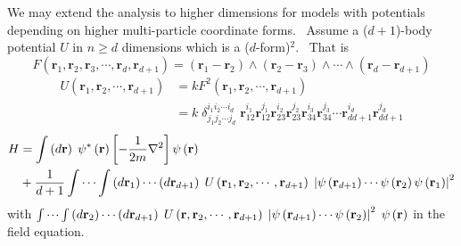 \documentclass[a4paper,12pt]{article}%
\begin{document}
We may extend the analysis to higher dimensions for models with potentials
depending on higher multi-particle coordinate forms. \ Assume a ($d+1$)-body
potential $U$ in $n\geq d$ dimensions which is a ($d$-form)$^{2}$. \ That is
\[
F\left(  \mathbf{r}_{1},\mathbf{r}_{2},\mathbf{r}_{3},\cdots,\mathbf{r}%
_{d},\mathbf{r}_{d+1}\right)  =(\mathbf{r}_{1}-\mathbf{r}_{2})\wedge
(\mathbf{r}_{2}-\mathbf{r}_{3})\wedge\cdots\wedge(\mathbf{r}_{d}%
-\mathbf{r}_{d+1})
\]%
\begin{align*}
U\left(  \mathbf{r}_{1},\mathbf{r}_{2},\cdots,\mathbf{r}_{d+1}\right)   &
=kF^{2}\left(  \mathbf{r}_{1},\mathbf{r}_{2},\cdots,\mathbf{r}_{d+1}\right) \\
&  =k\;\delta_{j_{1}j_{2}\cdots j_{d}}^{i_{1}i_{2}\cdots i_{d}}\;\mathbf{r}%
_{12}^{i_{1}}\mathbf{r}_{12}^{j_{1}}\mathbf{r}_{23}^{i_{2}}\mathbf{r}%
_{23}^{j_{2}}\mathbf{r}_{34}^{i_{3}}\mathbf{r}_{34}^{j_{3}}\cdots
\mathbf{r}_{dd+1}^{i_{d}}\mathbf{r}_{dd+1}^{j_{d}}%
\end{align*}%
\begin{align*}
H  &  =\int\left(  d\mathbf{r}\right)  \;\psi^{\ast}\left(  \mathbf{r}\right)
\left[  -\frac{1}{2m}\nabla^{2}\right]  \psi\left(  \mathbf{r}\right) \\
&  +\frac{1}{d+1}\idotsint\left(  d\mathbf{r}_{1}\right)  \cdots\left(
d\mathbf{r}_{d+1}\right)  \;U\left(  \mathbf{r}_{1},\mathbf{r}_{2}%
,\cdots,\mathbf{r}_{d+1}\right)  \;\left|  \psi\left(  \mathbf{r}%
_{d+1}\right)  \cdots\psi\left(  \mathbf{r}_{2}\right)  \psi\left(
\mathbf{r}_{1}\right)  \right|  ^{2}%
\end{align*}
with $\idotsint\left(  d\mathbf{r}_{2}\right)  \cdots\left(  d\mathbf{r}%
_{d+1}\right)  \;U\left(  \mathbf{r},\mathbf{r}_{2},\cdots,\mathbf{r}%
_{d+1}\right)  \;\left|  \psi\left(  \mathbf{r}_{d+1}\right)  \cdots
\psi\left(  \mathbf{r}_{2}\right)  \right|  ^{2}\;\psi\left(  \mathbf{r}%
\right)  $ in the field equation.
\end{document}

